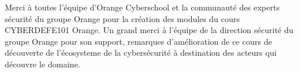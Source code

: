 

\newpage

\thispagestyle{empty}

\begin{center}


\large{Merci à toutes l'équipe d'Orange Cyberschool et la communauté des experts sécurité du groupe Orange pour la création des modules du cours CYBERDEFE101 Orange.
Un grand merci à l'équipe de la direction sécurité du groupe Orange pour son support, remarques d'amélioration de ce cours de découverte de l'écosysteme de la cybersécurité à destination des acteurs qui découvre le domaine. 
}



\end{center}




\clearpage 




